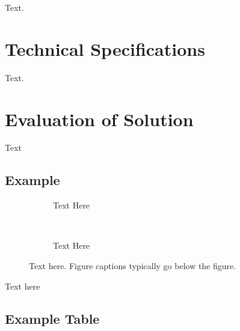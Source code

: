 \documentclass[a4paper, 12pt, english]{article}
\begin{document}
            Text.
                



    \section{Technical Specifications}
        \label{sec: Technical Specifications}

        Text.


    \section{Evaluation of Solution}
        \label{sec: Evaluation of Solution}

        Text



    \newpage




    \newpage


    \appendices

        \subsection{Example}\label{app:example}
            \begin{figure}[!h]
                \begin{subfigure}[t]{0.45\textwidth}
                    \centering
                    \caption{Text Here}
                    \label{subfig: example1}
                \end{subfigure}
                ~
                \begin{subfigure}[t]{0.45\textwidth}
                    \centering
                    \caption{Text Here}
                    \label{subfig: example2}
                \end{subfigure}
                

                \caption{Text here. Figure captions typically go below the figure.}
                \label{fig: example}
            \end{figure}

            \FloatBarrier

            Text here


        \subsection{Example Table}
            \label{app: example table}
\end{document}
